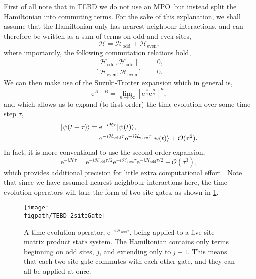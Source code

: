 First of all note that in TEBD we do not use an MPO, but instead split the Hamiltonian into commuting terms. For the sake of this explanation, we shall assume that the Hamiltonian only has nearest-neighbour interactions, and can therefore be written as a sum of terms on odd and even sites,
\begin{equation}
	\mathcal{H} = \mathcal{H}_{\mathrm{odd}} + \mathcal{H}_{\mathrm{even}},
	\label{eq:te1}
\end{equation}
where importantly, the following commutation relations hold,
\begin{align}
	\left[\mathcal{H}_{\mathrm{odd}}, \mathcal{H}_{\mathrm{odd}}\right] &= 0, \label{eq:te2} \\
	\left[\mathcal{H}_{\mathrm{even}}, \mathcal{H}_{\mathrm{even}}\right] &= 0. \label{eq:te3}
\end{align}
We can then make use of the Suzuki-Trotter expansion \cite{Suzuki1976} which in general is,
\begin{equation}
	\mathrm{e}^{A+B} = \lim_{n \rightarrow \infty}\left[ \mathrm{e}^{\frac{A}{n}} \mathrm{e}^{\frac{B}{n}}\right]^{n},
	\label{eq:te4}
\end{equation}
and which allows us to expand (to first order) the time evolution over some time-step \(\tau\),
\begin{align}
	|\psi(t+\tau)\rangle &= \mathrm{e}^{-i\mathcal{H}\tau}|\psi(t) \rangle, \notag \\
	&= \mathrm{e}^{-i\mathcal{H}_{\mathrm{odd}}\tau}\mathrm{e}^{-i\mathcal{H}_{\mathrm{even}}\tau}|\psi(t) \rangle + \mathcal{O}(\tau^{2}).
	\label{eq:te5}
\end{align}
In fact, it is more conventional to use the second-order expansion,
\begin{equation}
	\mathrm{e}^{-i\mathcal{H}\tau} = \mathrm{e}^{-i\mathcal{H}_{\mathrm{odd}}\tau / 2}\mathrm{e}^{-i\mathcal{H}_{\mathrm{even}}\tau}\mathrm{e}^{-i\mathcal{H}_{\mathrm{odd}}\tau / 2} + \mathcal{O}(\tau^{3}),
	\label{eq:te6}
\end{equation}
which provides additional precision for little extra computational effort \cite{Schollwock2011}. Note that since we have assumed nearest neighbour interactions here, the time-evolution operators will take the form of two-site gates, as shown in \cref{fig:te1}.
\begin{figure}[ht]
	\centering
	\texttt{[image: \\figpath/TEBD\_2siteGate]}
	\caption{\label{fig:te1} A time-evolution operator, \(\mathrm{e}^{-i\mathcal{H}_{\mathrm{odd}}\tau}\), being applied to a five site matrix product state system. The Hamiltonian contains only terms beginning on odd sites, \(j\), and extending only to \(j+1\). This means that each two site gate commutes with each other gate, and they can all be applied at once.}
\end{figure}%
